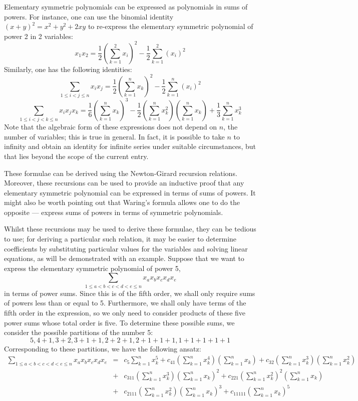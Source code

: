 \documentclass[12pt]{article}
\begin{document}
Elementary symmetric polynomials can be expressed as polynomials in sums of powers.  For instance, one can use the binomial identity $(x + y)^2 = x^2 + y^2 + 2 xy$ to re-express the elementary symmetric polynomial of power 2 in 2 variables:
 \[ x_1 x_2 = \frac{1}{2} \left(\sum_{k=1}^2 x_i \right)^2 - \frac{1}{2} \sum_{k=1}^2 (x_i)^2\]
Similarly, one has the following identities:
 \[ \sum_{1 \le i < j \le n} x_i x_j = \frac{1}{2} \left(\sum_{k=1}^n x_k \right)^2 - \frac{1}{2} \sum_{k=1}^n (x_i)^2 \]
 \[ \sum_{1 \le i < j < k\le n} x_i x_j x_k = \frac{1}{6} \left(\sum_{k=1}^n x_k \right)^3 - \frac{1}{2} \left(\sum_{k=1}^n x_k^2 \right) \left(\sum_{k=1}^n x_k \right) + \frac{1}{3} \sum_{k=1}^n x_k^3 \]
Note that the algebraic form of these expressions does not depend on $n$, the number of variables; this is true in general.  In fact, it is possible to take $n$ to infinity and obtain an identity for infinite series under suitable circumstances, but that lies beyond the scope of the current entry.

These formulae can be derived using the Newton-Girard recursion relations.  Moreover, these recursions can be used to provide an inductive proof that any elementary symmetric polynomial can be expressed in terms of sums of powers.  It might also be worth pointing out that Waring's formula allows one to do the opposite --- express sums of powers in terms of symmetric polynomials.

Whilst these recursions may be used to derive these formulae, they can be tedious to use; for deriving a particular such relation, it may be easier to determine coefficients by substituting particular values for the variables and solving linear equations, as will be demonstrated with an example.  Suppose that we want to express the elementary symmetric polynomial of power 5,
 \[ \sum_{1 \le a < b < c < d < e \le n} x_a x_b x_c x_d x_e \]
in terms of power sums.  Since this is of the fifth order, we shall only require sums of powers less than or equal to 5.  Furthermore, we shall only have terms of the fifth order in the expression, so we only need to consider products of these five power sums whose total order is five.  To determine these possible sums, we consider the possible partitions of the number 5:
 \[ 5, 4+1, 3+2, 3+1+1, 2+2+1, 2+1+1+1, 1+1+1+1+1 \]
Corresponding to these partitions, we have the following ansatz:
\begin{eqnarray*} \sum_{1 \le a < b < c < d < e \le n} x_a x_b x_c x_d x_e &=&
c_5 \sum_{k=1}^n x_k^5 + c_{41} \left(\sum_{k=1}^n x_k^4\right) \left(\sum_{k=1}^n x_k \right) + c_{32} \left(\sum_{k=1}^n x_k^3 \right) \left(\sum_{k=1}^n x_k^2 \right) \\ &+&
c_{311} \left(\sum_{k=1}^n x_k^3 \right) \left(\sum_{k=1}^n x_k \right)^2 + c_{221} \left(\sum_{k=1}^n x_k^2 \right)^2 \left(\sum_{k=1}^n x_k \right) \\ &+&  c_{2111} \left(\sum_{k=1}^n x_k^2 \right) \left(\sum_{k=1}^n x_k \right)^3 + c_{11111} \left(\sum_{k=1}^n x_k \right)^5
\end{eqnarray*}
\end{document}
